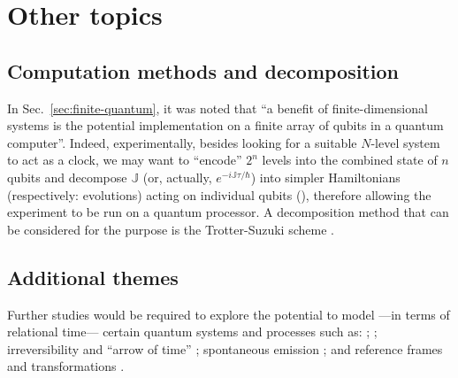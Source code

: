 \section{Other topics}\label{sec:outlook-misc}

\subsection{Computation methods and decomposition}

In Sec.~\ref{sec:finite-quantum}, it was noted that
``a benefit of finite-dimensional systems is the potential implementation on a finite array of
qubits in a quantum computer''.
Indeed,
experimentally,
besides looking for a suitable $N$-level system to act as a clock,
we may want to ``encode'' $2^{n}$ levels into the combined state of $n$
qubits and
decompose $\mathbb{J}$ (or, actually, $e^{-i\mathbb{J}\tau/\hbar}$)
into simpler Hamiltonians (respectively: evolutions)
acting on individual qubits (),
therefore allowing the experiment to be run on a quantum processor.
A decomposition method that can be considered for the purpose
is the Trotter-Suzuki scheme
\parencite{Trotter-Suzuki:exp, Trotter-Suzuki:GPU}.

\subsection{Additional themes}

Further studies 
would be required to explore the potential to model
---in terms of relational time---
certain quantum systems and processes such as:
%
 \parencite{crystal2,crystal3,crystal2012};
%
 \parencite{TQM1, TQM2};
%
irreversibility and ``arrow of time'' \parencite{Josset_Thermo};
%
spontaneous emission \parencite{Souza_Spontaneous};
%
and
reference frames and transformations \parencite{Adlam_ReferenceFrames}.
